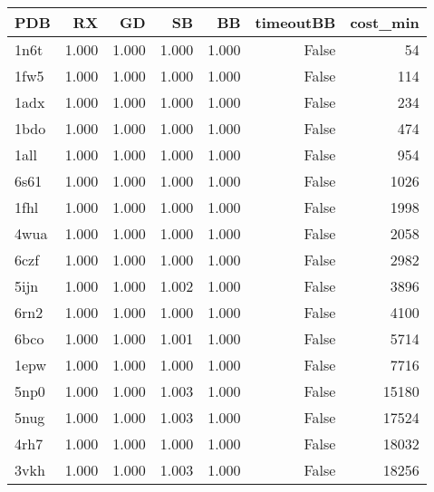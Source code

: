 \begin{tabular}{lrrrrrr}
\toprule
PDB & RX & GD & SB & BB & timeoutBB & cost_min \\
\midrule
1n6t & 1.000 & 1.000 & 1.000 & 1.000 & False & 54 \\
1fw5 & 1.000 & 1.000 & 1.000 & 1.000 & False & 114 \\
1adx & 1.000 & 1.000 & 1.000 & 1.000 & False & 234 \\
1bdo & 1.000 & 1.000 & 1.000 & 1.000 & False & 474 \\
1all & 1.000 & 1.000 & 1.000 & 1.000 & False & 954 \\
6s61 & 1.000 & 1.000 & 1.000 & 1.000 & False & 1026 \\
1fhl & 1.000 & 1.000 & 1.000 & 1.000 & False & 1998 \\
4wua & 1.000 & 1.000 & 1.000 & 1.000 & False & 2058 \\
6czf & 1.000 & 1.000 & 1.000 & 1.000 & False & 2982 \\
5ijn & 1.000 & 1.000 & 1.002 & 1.000 & False & 3896 \\
6rn2 & 1.000 & 1.000 & 1.000 & 1.000 & False & 4100 \\
6bco & 1.000 & 1.000 & 1.001 & 1.000 & False & 5714 \\
1epw & 1.000 & 1.000 & 1.000 & 1.000 & False & 7716 \\
5np0 & 1.000 & 1.000 & 1.003 & 1.000 & False & 15180 \\
5nug & 1.000 & 1.000 & 1.003 & 1.000 & False & 17524 \\
4rh7 & 1.000 & 1.000 & 1.000 & 1.000 & False & 18032 \\
3vkh & 1.000 & 1.000 & 1.003 & 1.000 & False & 18256 \\
\bottomrule
\end{tabular}
